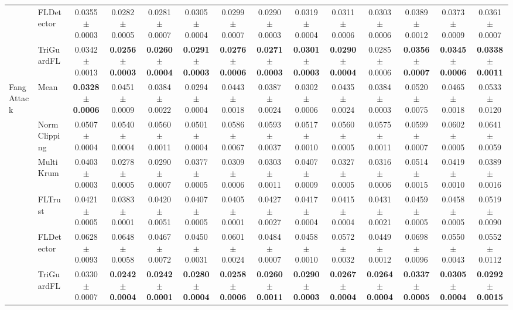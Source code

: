 \begin{table}[t]
\begin{tabular}{l l c c c c c c c c c c c c}
 & FLDetector & 0.0355$\pm$0.0003 & 0.0282$\pm$0.0005 & 0.0281$\pm$0.0007 & 0.0305$\pm$0.0004 & 0.0299$\pm$0.0007 & 0.0290$\pm$0.0003 & 0.0319$\pm$0.0004 & 0.0311$\pm$0.0006 & 0.0303$\pm$0.0006 & 0.0389$\pm$0.0012 & 0.0373$\pm$0.0009 & 0.0361$\pm$0.0007 \\
 & TriGuardFL & 0.0342$\pm$0.0013 & \textbf{0.0256$\pm$0.0003} & \textbf{0.0260$\pm$0.0004} & \textbf{0.0291$\pm$0.0003} & \textbf{0.0276$\pm$0.0006} & \textbf{0.0271$\pm$0.0003} & \textbf{0.0301$\pm$0.0003} & \textbf{0.0290$\pm$0.0004} & 0.0285$\pm$0.0006 & \textbf{0.0356$\pm$0.0007} & \textbf{0.0345$\pm$0.0006} & \textbf{0.0338$\pm$0.0011} \\
\midrule
\multirow{6}{*}{FangAttack} & Mean & \textbf{0.0328$\pm$0.0006} & 0.0451$\pm$0.0009 & 0.0384$\pm$0.0022 & 0.0294$\pm$0.0004 & 0.0443$\pm$0.0018 & 0.0387$\pm$0.0024 & 0.0302$\pm$0.0006 & 0.0435$\pm$0.0024 & 0.0384$\pm$0.0003 & 0.0520$\pm$0.0075 & 0.0465$\pm$0.0018 & 0.0533$\pm$0.0120 \\
 & NormClipping & 0.0507$\pm$0.0004 & 0.0540$\pm$0.0004 & 0.0560$\pm$0.0011 & 0.0501$\pm$0.0004 & 0.0586$\pm$0.0067 & 0.0593$\pm$0.0037 & 0.0517$\pm$0.0010 & 0.0560$\pm$0.0005 & 0.0575$\pm$0.0011 & 0.0599$\pm$0.0007 & 0.0602$\pm$0.0005 & 0.0641$\pm$0.0059 \\
 & MultiKrum & 0.0403$\pm$0.0003 & 0.0278$\pm$0.0005 & 0.0290$\pm$0.0007 & 0.0377$\pm$0.0005 & 0.0309$\pm$0.0006 & 0.0303$\pm$0.0011 & 0.0407$\pm$0.0009 & 0.0327$\pm$0.0005 & 0.0316$\pm$0.0006 & 0.0514$\pm$0.0015 & 0.0419$\pm$0.0010 & 0.0389$\pm$0.0016 \\
 & FLTrust & 0.0421$\pm$0.0005 & 0.0383$\pm$0.0001 & 0.0420$\pm$0.0051 & 0.0407$\pm$0.0005 & 0.0405$\pm$0.0001 & 0.0427$\pm$0.0027 & 0.0417$\pm$0.0004 & 0.0415$\pm$0.0004 & 0.0431$\pm$0.0021 & 0.0459$\pm$0.0005 & 0.0458$\pm$0.0005 & 0.0519$\pm$0.0090 \\
 & FLDetector & 0.0628$\pm$0.0093 & 0.0648$\pm$0.0058 & 0.0467$\pm$0.0072 & 0.0450$\pm$0.0031 & 0.0601$\pm$0.0024 & 0.0484$\pm$0.0007 & 0.0458$\pm$0.0010 & 0.0572$\pm$0.0032 & 0.0449$\pm$0.0012 & 0.0698$\pm$0.0096 & 0.0550$\pm$0.0043 & 0.0552$\pm$0.0112 \\
 & TriGuardFL & 0.0330$\pm$0.0007 & \textbf{0.0242$\pm$0.0004} & \textbf{0.0242$\pm$0.0001} & \textbf{0.0280$\pm$0.0004} & \textbf{0.0258$\pm$0.0006} & \textbf{0.0260$\pm$0.0011} & \textbf{0.0290$\pm$0.0003} & \textbf{0.0267$\pm$0.0004} & \textbf{0.0264$\pm$0.0004} & \textbf{0.0337$\pm$0.0005} & \textbf{0.0305$\pm$0.0004} & \textbf{0.0292$\pm$0.0015} \\

\end{tabular}
\end{table}
